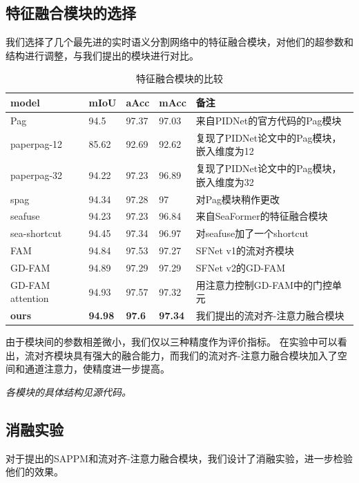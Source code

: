 \documentclass[11pt]{article}
\begin{document}
\subsection{特征融合模块的选择}
我们选择了几个最先进的实时语义分割网络中的特征融合模块，对他们的超参数和结构进行调整，与我们提出的模块进行对比。
\begin{table}[H]
    \centering
    \begin{tabular}{|l|l|l|l|l|}
    \hline
        model & mIoU & aAcc & mAcc & 备注 \\ \hline
        Pag & 94.5 & 97.37 & 97.03 & 来自PIDNet的官方代码的Pag模块 \\ \hline
        paperpag-12 & 85.62 & 92.69 & 92.62 & 复现了PIDNet论文中的Pag模块，嵌入维度为12 \\ \hline
        paperpag-32 & 94.22 & 97.23 & 96.89 & 复现了PIDNet论文中的Pag模块，嵌入维度为32 \\ \hline
        spag & 94.34 & 97.28 & 97 & 对Pag模块稍作更改 \\ \hline
        seafuse & 94.23 & 97.23 & 96.84 & 来自SeaFormer的特征融合模块 \\ \hline
        sea-shortcut & 94.45 & 97.34 & 96.97 & 对seafuse加了一个shortcut \\ \hline
        FAM & 94.84 & 97.53 & 97.27 & SFNet v1的流对齐模块 \\ \hline
        GD-FAM & 94.89 & 97.29 & 97.29 & SFNet v2的GD-FAM \\ \hline
        GD-FAM attention & 94.93 & 97.57 & 97.32 & 用注意力控制GD-FAM中的门控单元 \\ \hline
        \textbf{ours} & \textbf{94.98} & \textbf{97.6} & \textbf{97.34} & 我们提出的流对齐-注意力融合模块 \\ \hline
    \end{tabular}
\caption{特征融合模块的比较}
  \label{table:5}
\end{table}

由于模块间的参数相差微小，我们仅以三种精度作为评价指标。
在实验中可以看出，流对齐模块具有强大的融合能力，而我们的流对齐-注意力融合模块加入了空间和通道注意力，使精度进一步提高。

\textit{各模块的具体结构见源代码。}
\subsection{消融实验}
对于提出的SAPPM和流对齐-注意力融合模块，我们设计了消融实验，进一步检验他们的效果。
\end{document}
